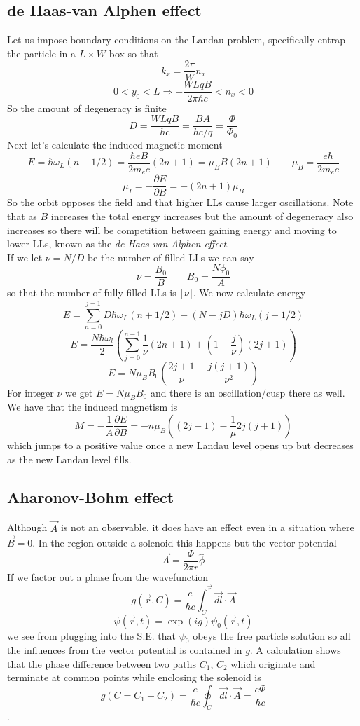 \documentclass{article}
\begin{document}
\subsection{de Haas-van Alphen effect}
Let us impose boundary conditions on the Landau problem, specifically entrap the particle in a $L\times W$ box so that
$$k_x =\frac{2\pi}{W} n_x$$
$$0<y_0<L \Rightarrow -\frac{WLqB}{2\pi \hbar c} < n_x < 0$$
So the amount of degeneracy is finite
$$D=\frac{WLqB}{hc}=\frac{BA}{hc/q}=\frac{\Phi}{\Phi_0}$$
Next let's calculate the induced magnetic moment
$$E=\hbar \omega_L (n+1/2) = \frac{\hbar eB}{2m_e c} (2n+1) = \mu_B B (2n+1) \qquad \mu_B = \frac{e\hbar}{2m_e c}$$
$$\mu_I = -\frac{\partial E}{\partial B} = -(2n+1)\mu_B$$
So the orbit opposes the field and that higher LLs cause larger oscillations. Note that as $B$ increases the total energy increases but the amount of degeneracy also increases so there will be competition between gaining energy and moving to lower LLs, known as the \emph{de Haas-van Alphen effect}.\\
If we let $\nu =N/D$ be the number of filled LLs we can say
$$\nu = \frac{B_0}{B} \qquad B_0=\frac{N\phi_0}{A}$$
so that the number of fully filled LLs is $\lfloor \nu \rfloor$. We now calculate energy
$$E=\sum_{n=0}^{j-1} D\hbar \omega_L (n+1/2)+(N-jD)\hbar \omega_L (j+1/2)$$
$$E=\frac{N\hbar \omega_l}{2} \left(\sum_{j=0}^{n-1}\frac{1}{\nu} (2n+1) +  (1-\frac{j}{\nu}) (2j+1)\right)$$
$$E=N\mu_B B_0 \left(\frac{2j+1}{\nu}-\frac{j(j+1)}{\nu^2}\right)$$
For integer $\nu$ we get $E=N\mu_B B_0$ and there is an oscillation/cusp there as well. We have that the induced magnetism is
$$M=-\frac{1}{A} \frac{\partial E}{\partial B} = -n\mu_B \left((2j+1)-\frac{1}{\mu} 2j(j+1)\right)$$
which jumps to a positive value once a new Landau level opens up but decreases as the new Landau level fills.
\subsection{Aharonov-Bohm effect}
Although $\vec A$ is not an observable, it does have an effect even in a situation where $\vec B = 0$. In the region outside a solenoid this happens but the vector potential
$$\vec A = \frac{\Phi}{2\pi r} \hat \phi$$
If we factor out a phase from the wavefunction
$$g(\vec r, C) =\frac{e}{\hbar c}\int_C^{\vec r}\vec {dl}\cdot \vec A$$
$$\psi(\vec r, t) = \exp(ig)\psi_0 (\vec r, t)$$
we see from plugging into the S.E. that $\psi_0$ obeys the free particle solution so all the influences from the vector potential is contained in $g$. A calculation shows that the phase difference between two paths $C_1$, $C_2$ which originate and terminate at common points while enclosing the solenoid is
$$g(C=C_1-C_2)=\frac{e}{\hbar c} \oint_C \vec{dl}\cdot \vec{A} = \frac{e\Phi}{\hbar c}$$.
\end{document}
